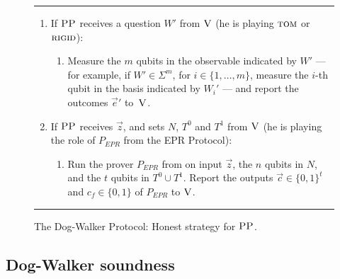 \documentclass{toc}
\newcommand{\rigid}{\textsc{rigid}}
\newcommand{\tom}{\textsc{tom}}
\newcommand{\ver}{\textsc{V}}
\newcommand{\pp}{\textsc{PP}}
\begin{document}
\begin{figure}[H]
\rule[1ex]{\textwidth}{0.5pt}
\vspace{-20pt}
\begin{enumerate}
  \item If $\pp$ receives a question ${W}'$ from $\ver$ (he is playing $\tom$ or $\rigid$):
\begin{enumerate}
     \item[]  Measure the $m$ qubits in the observable indicated by $W'$ --- for example, if $W'\in\Sigma^m$, for $i\in \{1,\ldots,m\}$, measure the $i$-th qubit in the basis indicated by $W_i'$ --- and report
       the outcomes $\vec{e}'$ to~$\ver$.
\end{enumerate}
\item If $\pp$ receives $\vec{z}$, and sets $N$, $T^0$ and $T^1$ from $\ver$ (he is playing the role of $P_{EPR}$ from the EPR Protocol):
\begin{enumerate}
     \item[] Run the prover $P_{EPR}$ from  on input $\vec{z}$, the $n$ qubits in $N$, and the $t$ qubits in $T^0\cup T^1$.
     Report the outputs $\vec{c}\in\{0,1\}^t$ and $c_f\in\{0,1\}$ of $P_{EPR}$  to $\ver$. 
\end{enumerate}
\end{enumerate}
\rule[2ex]{\textwidth}{0.5pt}\vspace{-.5cm}
\caption{The Dog-Walker Protocol: Honest strategy for $\pp$.}\label{fig:dogwalker-protocol-PP}
\end{figure}




\subsection{Dog-Walker soundness}  %
%
\end{document}
